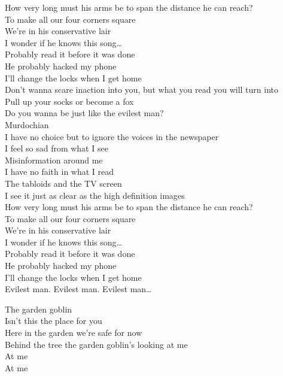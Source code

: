 How very long must his arms be to span the distance he can reach? \\
To make all our four corners square \\
We're in his conservative lair \\
I wonder if he knows this song… \\
Probably read it before it was done \\
He probably hacked my phone \\
I'll change the locks when I get home \\

Don't wanna scare inaction into you, but what you read you will turn into \\
Pull up your socks or become a fox \\
Do you wanna be just like the evilest man? \\
Murdochian \\

I have no choice but to ignore the voices in the newspaper \\
I feel so sad from what I see \\
Misinformation around me \\
I have no faith in what I read \\
The tabloids and the TV screen \\
I see it just as clear as the high definition images \\
How very long must his arms be to span the distance he can reach? \\
To make all our four corners square \\
We're in his conservative lair \\
I wonder if he knows this song… \\
Probably read it before it was done \\
He probably hacked my phone \\
I'll change the locks when I get home \\

Evilest man. Evilest man. Evilest man… \\




The garden goblin \\

Isn't this the place for you \\
Here in the garden we're safe for now \\
Behind the tree the garden goblin's looking at me \\
At me \\
At me \\


